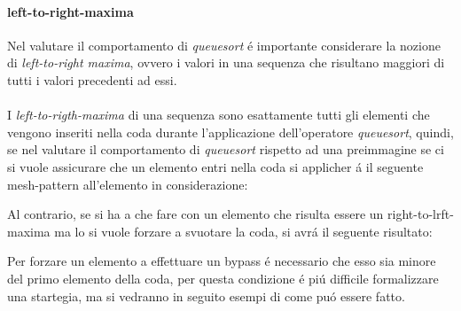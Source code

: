 \paragraph*{left-to-right-maxima}Nel valutare il comportamento di \textit{queuesort} \'e importante considerare la nozione di \textit{left-to-right maxima}, ovvero i valori in una sequenza che risultano maggiori di tutti i valori precedenti ad essi.\\\\
I \textit{left-to-rigth-maxima} di una sequenza sono esattamente tutti gli elementi che vengono inseriti nella coda durante l'applicazione dell'operatore \textit{queuesort}, quindi, se nel valutare il comportamento di \textit{queuesort} rispetto ad una preimmagine se ci si vuole assicurare che un elemento entri nella coda si applicher \'a il seguente mesh-pattern all'elemento in considerazione:
\begin{center}
\end{center}
Al contrario, se si ha a che fare con un elemento che risulta essere un right-to-lrft-maxima ma lo si vuole forzare a svuotare la coda, si avr\'a il seguente risultato:
\begin{center}
\end{center}
Per forzare un elemento a effettuare un bypass \'e necessario che esso sia minore del primo elemento della coda, per questa condizione \'e pi\'u difficile formalizzare una startegia, ma si vedranno in seguito esempi di come pu\'o essere fatto. 
